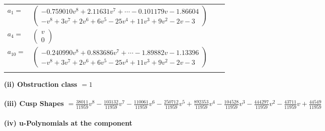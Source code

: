 \documentclass[1p]{elsarticle_modified}
\theoremstyle{definition}
\begin{document}
\begin{tabular}{m{7pt} m{180pt} m{7pt} m{180pt} }
\flushright $a_{1}=$&$\begin{pmatrix}-0.759010 v^{8}+2.11631 v^{7}+\cdots-0.101179 v-1.86604\\- v^8+3 v^7+2 v^6+6 v^5-25 v^4+11 v^3+9 v^2-2 v-3\end{pmatrix}$ \\
\flushright $a_{4}=$&$\begin{pmatrix}v\\0\end{pmatrix}$ \\
\flushright $a_{10}=$&$\begin{pmatrix}-0.240990 v^{8}+0.883686 v^{7}+\cdots-1.89882 v-1.13396\\- v^8+3 v^7+2 v^6+6 v^5-25 v^4+11 v^3+9 v^2-2 v-3\end{pmatrix}$\\&\end{tabular}
\flushleft \textbf{(ii) Obstruction class $= 1$}\\~\\
\flushleft \textbf{(iii) Cusp Shapes $= \frac{38011}{11959} v^8-\frac{103132}{11959} v^7-\frac{110061}{11959} v^6-\frac{250712}{11959} v^5+\frac{892353}{11959} v^4-\frac{104528}{11959} v^3-\frac{444297}{11959} v^2-\frac{43711}{11959} v+\frac{44549}{11959}$}\\~\\
\newpage\renewcommand{\arraystretch}{1}
\flushleft \textbf{(iv) u-Polynomials at the component}\newline \\
\end{document}
